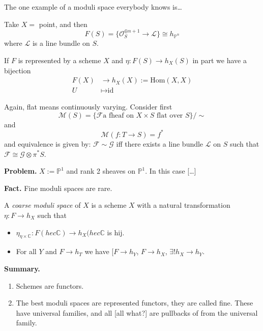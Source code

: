 \medskip\noindent

The one example of a moduli space everybody knows is…

\begin{example}
\label{example-projective-space-is-a-quotient}
Take $X=$ point, and then
$$
F(S)=\{\mathcal{O}_S^{\oplus n+1}\to \mathcal{L}\}\cong h_{\mathbb{P}^n}
$$
where $\mathcal{L}$ is a line bundle on $S$.
\end{example}

\begin{definition}
\label{definition-universal-family}
If $F$ is represented by a scheme $X$ and $\eta:F(S)\to h_X(S)$ in part we have
a bijection
\begin{align*}
F(X) &\longrightarrow h_X(X):=\text{Hom}(X,X) \\
U &\longmapsto \text{id}
\end{align*}
\end{definition}

\bigskip\noindent

Again, flat means continuously varying. Consider first
$$
\mathcal{M}(S)=\{\mathcal{F}\text{a fheaf on $X\times S$ flat over }S\}/\sim
$$
and
$$
\mathcal{M}(f:T \to S)=f^*
$$
and equivalence is given by: $\mathcal{F}\sim \mathcal{G}$ iff there exists a
line bundle $\mathcal{L}$ on $S$ such that 
$\mathcal{F}\cong \mathcal{G}\otimes\pi^*S$.

{\bf Problem.} $X:=\mathbb{P}^1$ and rank 2 sheaves on $\mathbb{P}^1$. In this
case […]

{\bf Fact.} Fine moduli spaces are rare.

\begin{definition}
\label{definition-coarse-moduli-space}
A {\it coarse moduli space} of  $X$ is a scheme $X$ with a natural
transformation $\eta:F \to h_X$ such that
\begin{itemize}
\item $\eta_{\eta \times \mathbb{C}}:F(hec \mathbb{C}) \to h_X(hec \mathbb{C}$
is hij.
\item For all $Y$ and $F \to h_T$ we have [$F \to h_Y$, $F\to h_X$, $\exists !
h_X \to h_Y$.
\end{itemize}
\end{definition}

{\bf Summary.}
\begin{enumerate}
\item Schemes are functors.
\item The best moduli spaces are represented functors, they are called fine.
These have universal families, and all [all what?] are pullbacks of from the
universal family.
\end{enumerate}

